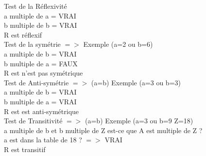 \vspace{5mm} %

Test de la Réflexivité \\

a multiple de a = VRAI \\
b multiple de b = VRAI \\
R est réflexif \\

Test de la symétrie $=>$ Exemple (a=2 ou b=6) \\

a multiple de b = VRAI \\
b multiple de a = FAUX \\
R est n'est pas symétrique \\


Test de Anti-symétrie $=>$ (a=b) Exemple (a=3 ou b=3) \\

a multiple de b = VRAI \\
b multiple de a = VRAI \\
R est est anti-symétrique \\


Test de Transitivité $=>$ (a=b) Exemple (a=3 ou b=9 Z=18) \\

a multiple de b et b multiple de Z est-ce que A est multiple de Z ? \\
a est dans la table de 18 ?  $=>$ VRAI \\
R est transitif \\
